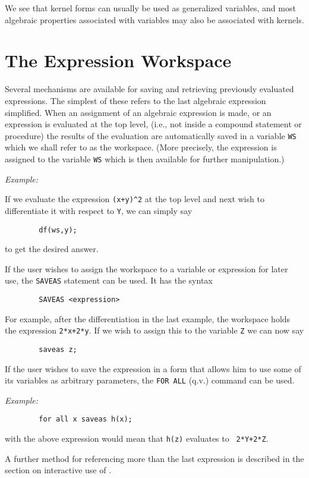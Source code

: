 We see that kernel forms can usually be used as generalized variables, and
most algebraic properties associated with variables may also be associated
with kernels.

\section{The Expression Workspace}

Several mechanisms are available for saving and retrieving previously
evaluated expressions.  The simplest of these refers to the last algebraic
expression simplified.  When an assignment of an algebraic expression is
made, or an expression is evaluated at the top level, (i.e., not inside a
compound statement or procedure) the results of the evaluation are
automatically saved in a variable {\tt WS} which we shall refer to as the
workspace. (More precisely, the expression is assigned to the variable
{\tt WS} which is then available for further manipulation.)

{\it Example:}

If we evaluate the expression {\tt (x+y)\^{ }2} at the top level and next
wish to differentiate it with respect to {\tt Y}, we can simply say
\begin{verbatim}
        df(ws,y);
\end{verbatim}
to get the desired answer.

If the user wishes to assign the workspace to a variable or expression for
later use, the {\tt SAVEAS}  statement can be used.  It
has the syntax
\begin{verbatim}
        SAVEAS <expression>
\end{verbatim}
For example, after the differentiation in the last example, the workspace
holds the expression {\tt 2*x+2*y}.  If we wish to assign this to the
variable {\tt Z} we can now say
\begin{verbatim}
        saveas z;
\end{verbatim}
If the user wishes to save the expression in a form that allows him to use
some of its variables as arbitrary parameters, the {\tt FOR ALL} (q.v.)
command can be used.

{\it Example:}
\begin{verbatim}
        for all x saveas h(x);
\end{verbatim}

with the above expression would mean that {\tt h(z)} evaluates to {\tt
2*Y+2*Z}.

A further method for referencing more than the last expression is described
in the section on interactive use of {\REDUCE}.


